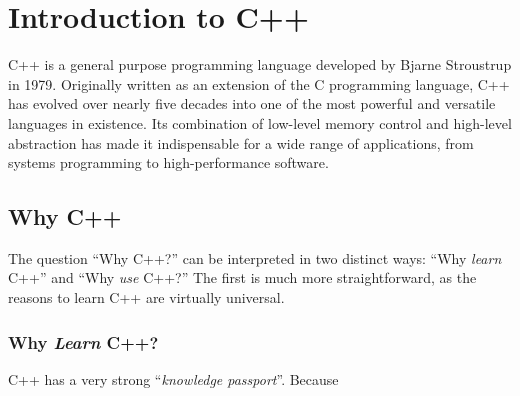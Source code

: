 \section{Introduction to C++}

\noindent
C++ is a general purpose programming language developed by Bjarne Stroustrup in 1979. Originally written as an extension of the C programming language, C++ has evolved over nearly five decades into one of the most powerful and versatile languages in existence. Its combination of low-level memory control and high-level abstraction has made it indispensable for a wide range of applications, from systems programming to high-performance software.

\subsection{Why C++}

\noindent
The question ``Why C++?'' can be interpreted in two distinct ways: ``Why \textsl{learn} C++'' and ``Why \textsl{use} C++?'' The first is much more straightforward, as the reasons to learn C++ are virtually universal.

\subsubsection*{Why \textsl{Learn} C++?}

C++ has a very strong ``\textsl{knowledge passport}''. Because 
